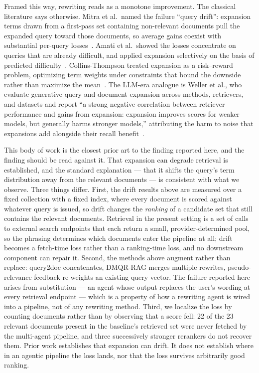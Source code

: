 Framed this way, rewriting reads as a monotone improvement. The classical
literature says otherwise. Mitra et al.\ named the failure ``query drift'':
expansion terms drawn from a first-pass set containing non-relevant documents
pull the expanded query toward those documents, so average gains coexist with
substantial per-query losses~\cite{mitra1998expansion}. Amati et al.\ showed the
losses concentrate on queries that are already difficult, and applied expansion
selectively on the basis of predicted difficulty~\cite{amati2004drift}.
Collins-Thompson treated expansion as a risk--reward problem, optimizing term
weights under constraints that bound the downside rather than maximize the
mean~\cite{collinsthompson2009risk}. The LLM-era analogue is Weller et al., who
evaluate generative query and document expansion across methods, retrievers, and
datasets and report ``a strong negative correlation between retriever
performance and gains from expansion: expansion improves scores for weaker
models, but generally harms stronger models,'' attributing the harm to noise
that expansions add alongside their recall
benefit~\cite{weller2024expansions}.

This body of work is the closest prior art to the finding reported here, and the
finding should be read against it. That expansion can degrade retrieval is
established, and the standard explanation --- that it shifts the query's term
distribution away from the relevant documents --- is consistent with what we
observe. Three things differ. First, the drift results above are measured over a
fixed collection with a fixed index, where every document is scored against
whatever query is issued, so drift changes the \emph{ranking} of a candidate set
that still contains the relevant documents. Retrieval in the present setting is a
set of calls to external search endpoints that each return a small,
provider-determined pool, so the phrasing determines which documents enter the
pipeline at all; drift becomes a fetch-time loss rather than a ranking-time loss,
and no downstream component can repair it. Second, the methods above augment
rather than replace: query2doc concatenates, DMQR-RAG merges multiple rewrites,
pseudo-relevance feedback re-weights an existing query vector. The failure
reported here arises from substitution --- an agent whose output replaces the
user's wording at every retrieval endpoint --- which is a property of how a
rewriting agent is wired into a pipeline, not of any rewriting method. Third, we
localize the loss by counting documents rather than by observing that a score
fell: 22 of the 23 relevant documents present in the baseline's retrieved set
were never fetched by the multi-agent pipeline, and three successively stronger
rerankers do not recover them. Prior work establishes that expansion can drift.
It does not establish where in an agentic pipeline the loss lands, nor that the
loss survives arbitrarily good ranking.

